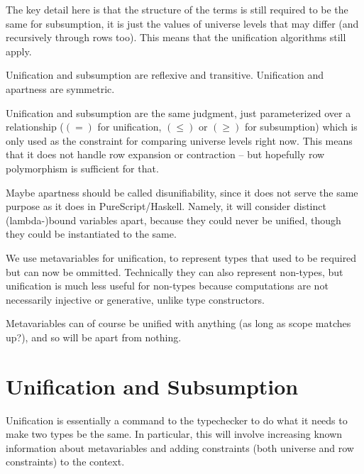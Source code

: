 \documentclass[11pt, twoside, reqno]{book}
\begin{document}
The key detail here is that the structure of the terms is still required to be the same for subsumption, it is just the values of universe levels that may differ (and recursively through rows too).
This means that the unification algorithms still apply.


Unification and subsumption are reflexive and transitive.
Unification and apartness are symmetric.


Unification and subsumption are the same judgment, just parameterized over a relationship (\((=)\) for unification, \((\le)\) or \((\ge)\) for subsumption) which is only used as the constraint for comparing universe levels right now.
This means that it does not handle row expansion or contraction -- but hopefully row polymorphism is sufficient for that.

Maybe apartness should be called disunifiability, since it does not serve the same purpose as it does in PureScript/Haskell.
Namely, it will consider distinct (lambda-)bound variables apart, because they could never be unified, though they could be instantiated to the same.

We use metavariables for unification, to represent types that used to be required but can now be ommitted.
Technically they can also represent non-types, but unification is much less useful for non-types because computations are not necessarily injective or generative, unlike type constructors.

Metavariables can of course be unified with anything (as long as scope matches up?), and so will be apart from nothing.

%

%

\iffalse
\section{Unification and Subsumption}
Unification is essentially a command to the typechecker to do what it needs to make two types be the same.
In particular, this will involve increasing known information about metavariables and adding constraints (both universe and row constraints) to the context.
\end{document}
